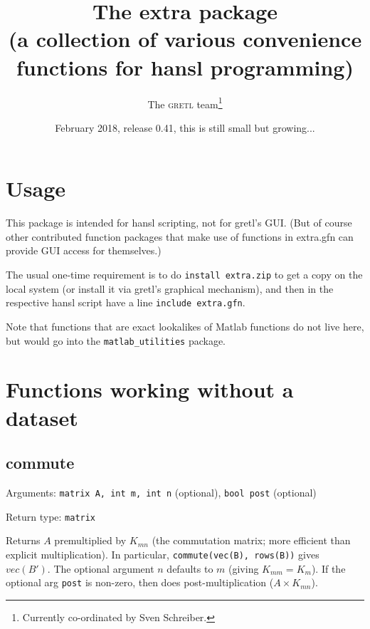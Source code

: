 \documentclass[11pt,english]{article}
\newcommand{\noun}[1]{\textsc{#1}}
\begin{document}
\title{The extra package\\
(a collection of various convenience functions for hansl programming) }

\date{February 2018, release 0.41, this is still small but growing... }

\author{The \noun{gretl} team\thanks{Currently co-ordinated by Sven Schreiber.}}

\maketitle
\tableofcontents{}

\section{Usage}

This package is intended for hansl scripting, not for gretl's GUI.
(But of course other contributed function packages that make use of
functions in extra.gfn can provide GUI access for themselves.)

The usual one-time requirement is to do \texttt{install extra.zip}
to get a copy on the local system (or install it via gretl's graphical
mechanism), and then in the respective hansl script have a line \texttt{include
extra.gfn}.

Note that functions that are exact lookalikes of Matlab functions
do not live here, but would go into the \texttt{matlab\_utilities}
package.

\section{Functions working without a dataset}

\subsection{commute}

Arguments: \texttt{matrix A, int m, int n} (optional), \texttt{bool
post} (optional)

\noindent Return type: \texttt{matrix}

Returns $A$ premultiplied by $K_{mn}$ (the commutation matrix; more
efficient than explicit multiplication). In particular, \texttt{commute(vec(B),
rows(B))} gives $vec(B')$. The optional argument $n$ defaults to
$m$ (giving $K_{mm}=K_{m}$). If the optional arg \texttt{post} is
non-zero, then does post-multiplication ($A\times K_{mn}$). 
\end{document}
